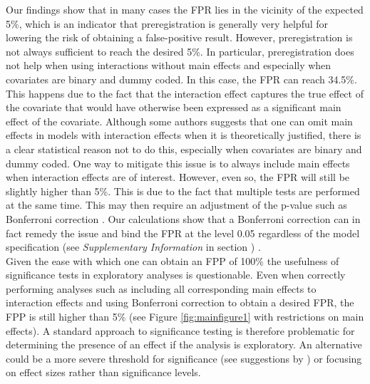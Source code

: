 
Our findings show that in many cases the FPR lies in the vicinity of the expected 5\%, which is an indicator that preregistration is generally very helpful for lowering the risk of obtaining a false-positive result. However, preregistration is not always sufficient to reach the desired 5\%. In particular, preregistration does not help when using interactions without main effects and especially when covariates are binary and dummy coded. In this case, the FPR can reach 34.5\%. This happens due to the fact that the interaction effect captures the true effect of the covariate that would have otherwise been expressed as a significant main effect of the covariate. Although some authors suggests that one can omit main effects in models with interaction effects when it is theoretically justified, there is a clear statistical reason not to do this, especially when covariates are binary and dummy coded. One way to mitigate this issue is to always include main effects when interaction effects are of interest. However, even so, the FPR will still be slightly higher than 5\%. This is due to the fact that multiple tests are performed at the same time. This may then require an adjustment of the p-value such as Bonferroni correction \citep{dunn1961multiple}. Our calculations show that a Bonferroni correction can in fact remedy the issue and bind the FPR at the level 0.05 regardless of the model specification (see \textit{Supplementary Information} in section ) . \\

Given the ease with which one can obtain an FPP of 100\% the usefulness of significance tests in exploratory analyses is questionable. Even when correctly performing analyses such as including all corresponding main effects to interaction effects and using Bonferroni correction to obtain a desired FPR, the FPP is still higher than 5\% (see Figure \ref{fig:mainfigure1} with restrictions on main effects). A standard approach to significance testing is therefore problematic for determining the presence of an effect if the analysis is exploratory. An alternative could be a more severe threshold for significance (see suggestions by \cite{benjamin2018}) or focusing on effect sizes rather than significance levels. \\
    
